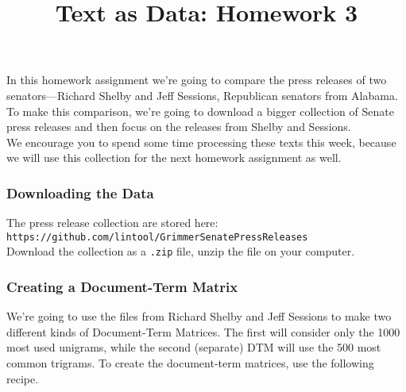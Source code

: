 \documentclass[12pt,letterpaper]{article}
\title{Text as Data: Homework 3}
\date{}
\begin{document}
\maketitle


In this homework assignment we're going to compare the press releases of two senators---Richard Shelby and Jeff Sessions, Republican senators from Alabama.  To make this comparison, we're going to download a bigger collection of Senate press releases and then focus on the releases from Shelby and Sessions.  \\

We encourage you to spend some time processing these texts this week, because we will use this collection for the next homework assignment as well.  

\subsubsection*{Downloading the Data}

The press release collection are stored here:\\
{\tt https://github.com/lintool/GrimmerSenatePressReleases} \\

Download the collection as a {\tt .zip} file, unzip the file on your computer.  


\subsubsection*{Creating a Document-Term Matrix}

We're going to use the files from Richard Shelby and Jeff Sessions to make two different kinds of Document-Term Matrices. The first will consider only the 1000 most used unigrams, while the second (separate) DTM will use the 500 most common trigrams. To create the document-term matrices, use the following recipe.
\end{document}
